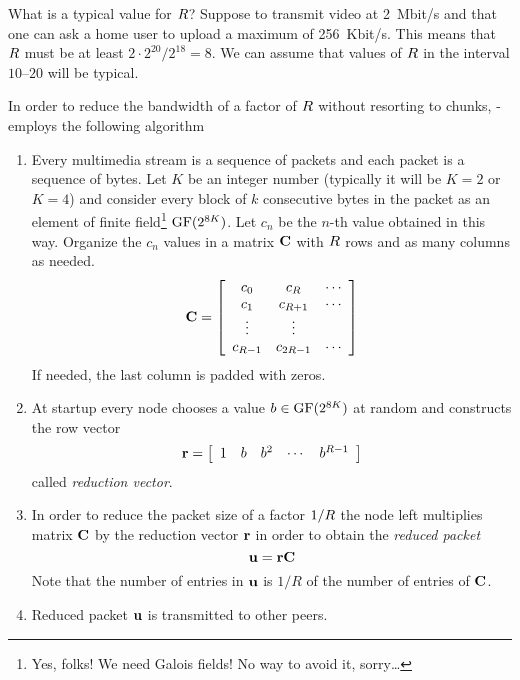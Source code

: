 \documentclass{medusabook}
\begin{document}
\begin{example}
What is a typical value for $R$?  Suppose to transmit video at
2~Mbit/s and that one can ask a home user to upload a maximum of
256~Kbit/s.  This means that $R$ must be at least $2\cdot
2^{20}/2^{18} = 8$.  We can assume that values of $R$ in the
interval $10$--$20$ will be typical.
\end{example}

In order to reduce the bandwidth of a factor of $R$ without
resorting to chunks, \medusa- employs the following algorithm

\begin{enumerate}
\item
Every multimedia stream is a sequence of packets and each packet is a
sequence of bytes.  Let $K$ be an integer number (typically it will be
$K=2$ or $K=4$) and consider every block of $k$ consecutive bytes in
the packet as an element of finite field\footnote{Yes, folks! We need
Galois fields! No way to avoid it, sorry\ldots} $\operatorname{GF}(2^{8K})$.  Let
$c_n$ be the $n$-th value obtained in this way.  Organize the $c_n$
values in a matrix ${\mathbf C}$ with $R$ rows and as many columns as
needed. 
%
\begin{equation}
\label{eq:0;medusa_book}
{\mathbf C} = 
 \left[
   \begin{array}{ccc}
     c_0           & c_{R}   & \cdots \\
     c_1           & c_{R+1} & \cdots \\
     \vdots        & \vdots \\
     c_{R-1} & c_{2R-1} & \cdots \\
   \end{array}
 \right]
\end{equation}
%
If needed, the last column is padded with zeros.
\item
At startup every node chooses a value $b \in \operatorname{GF}(2^{8K})$ at
random and constructs the row vector
%
\begin{equation}
\label{eq:1;medusa_book}
{\mathbf r} = 
\left[ 
  \begin{array}{ccccc}
    1 & b & b^2 & \cdots & b^{R-1}
  \end{array}
\right]
\end{equation}
%
called \emph{reduction vector}.
\item
In order to reduce the packet size of a factor $1/R$  the node
left multiplies matrix ${\mathbf C}$ by the reduction vector ${\mathbf r}$ in
order to obtain the \emph{reduced packet}
%
\begin{equation}
\label{eq:2;medusa_book}
{\mathbf u} = {\mathbf r} {\mathbf C}
\end{equation}
%
Note that the number of entries in ${\mathbf u}$ is $1/R$ of the number of
entries of ${\mathbf C}$.
\item
Reduced packet ${\mathbf u}$ is transmitted to other peers.
\end{enumerate}
\end{document}
